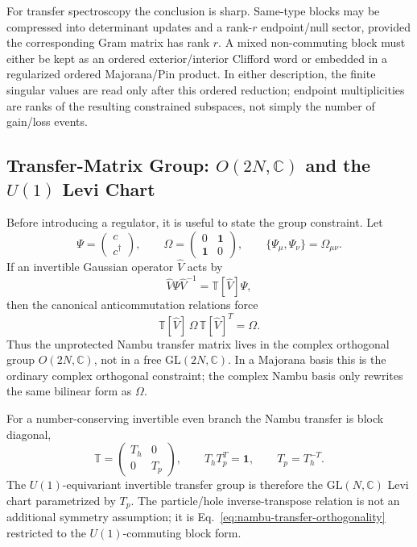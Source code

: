 \documentclass[aps,prb,onecolumn,nofootinbib,superscriptaddress]{revtex4-2}
\newcommand{\I}{\mathbf{1}}
\theoremstyle{plain}
\theoremstyle{definition}
\begin{document}
For transfer spectroscopy the conclusion is sharp.  Same-type blocks may be
compressed into determinant updates and a rank-\(r\) endpoint/null sector,
provided the corresponding Gram matrix has rank \(r\).  A mixed non-commuting
block must either be kept as an ordered exterior/interior Clifford word or
embedded in a regularized ordered Majorana/Pin product.  In either
description, the finite singular values are read only after this ordered
reduction; endpoint multiplicities are ranks of the resulting constrained
subspaces, not simply the number of gain/loss events.

\subsection{\texorpdfstring{Transfer-Matrix Group: \(O(2N,\mathbb C)\) and
the \(U(1)\) Levi Chart}{Transfer-Matrix Group: O(2N,C) and the U(1) Levi Chart}}
\label{sec:nambu-transfer-group-structure}

Before introducing a regulator, it is useful to state the group constraint.
Let
\begin{equation}
  \Psi=\begin{pmatrix}c\\ c^\dagger\end{pmatrix},
  \qquad
  \Omega=\begin{pmatrix}0&\I\\ \I&0\end{pmatrix},
  \qquad
  \{\Psi_\mu,\Psi_\nu\}=\Omega_{\mu\nu}.
  \label{eq:nambu-group-car-form}
\end{equation}
If an invertible Gaussian operator \(\hat V\) acts by
\begin{equation}
  \hat V\Psi\hat V^{-1}=\mathbb T[\hat V]\Psi ,
  \label{eq:nambu-transfer-action-group}
\end{equation}
then the canonical anticommutation relations force
\begin{equation}
  \mathbb T[\hat V]\,\Omega\,\mathbb T[\hat V]^T=\Omega .
  \label{eq:nambu-transfer-orthogonality}
\end{equation}
Thus the unprotected Nambu transfer matrix lives in the complex orthogonal
group \(O(2N,\mathbb C)\), not in a free \(\mathrm{GL}(2N,\mathbb C)\).  In a
Majorana basis this is the ordinary complex orthogonal constraint; the complex
Nambu basis only rewrites the same bilinear form as \(\Omega\).

For a number-conserving invertible even branch the Nambu transfer is block
diagonal,
\begin{equation}
  \mathbb T=
  \begin{pmatrix}
    T_h&0\\
    0&T_p
  \end{pmatrix},
  \qquad
  T_hT_p^T=\I,
  \qquad
  T_p=T_h^{-T}.
  \label{eq:u1-levi-nambu-transfer}
\end{equation}
The \(U(1)\)-equivariant invertible transfer group is therefore the
\(\mathrm{GL}(N,\mathbb C)\) Levi chart parametrized by \(T_p\).  The
particle/hole inverse-transpose relation is not an additional symmetry
assumption; it is Eq.~\eqref{eq:nambu-transfer-orthogonality} restricted to
the \(U(1)\)-commuting block form.
\end{document}
